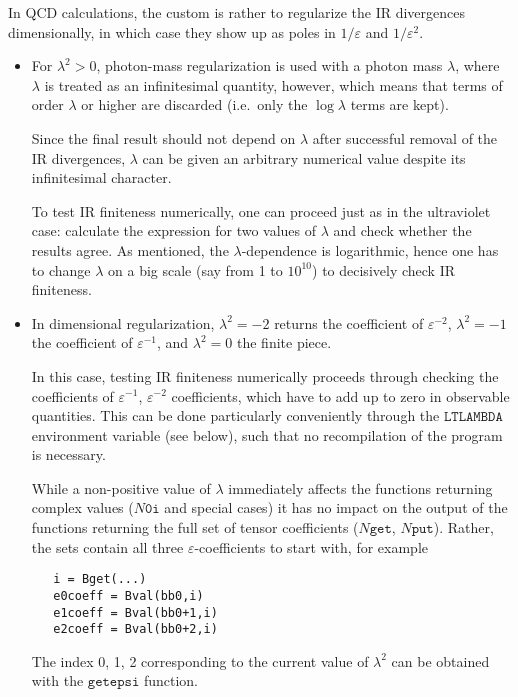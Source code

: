 \documentclass[twoside,12pt]{report}
\def\ie{i.e.\ }
\def\Code#1{\ensuremath{\texttt{#1}}}
\begin{document}
In QCD calculations, the custom is rather to regularize the IR 
divergences dimensionally, in which case they show up as poles in
$1/\varepsilon$ and $1/\varepsilon^2$.
%

\begin{itemize}
\item
For $\lambda^2 > 0$, photon-mass regularization is used with a photon
mass $\lambda$, where $\lambda$ is treated as an infinitesimal quantity,
however, which means that terms of order $\lambda$ or higher are 
discarded (\ie only the $\log\lambda$ terms are kept).

Since the final result should not depend on $\lambda$ after successful 
removal of the IR divergences, $\lambda$ can be given an arbitrary 
numerical value despite its infinitesimal character.

To test IR finiteness numerically, one can proceed just as in the
ultraviolet case: calculate the expression for two values of $\lambda$
and check whether the results agree.  As mentioned, the
$\lambda$-dependence is logarithmic, hence one has to change $\lambda$
on a big scale (say from 1 to $10^{10}$) to decisively check IR
finiteness.

\item
In dimensional regularization, $\lambda^2 = -2$ returns the coefficient
of $\varepsilon^{-2}$, $\lambda^2 = -1$ the coefficient of
$\varepsilon^{-1}$, and $\lambda^2 = 0$ the finite piece.

In this case, testing IR finiteness numerically proceeds through
checking the coefficients of $\varepsilon^{-1}$, $\varepsilon^{-2}$
coefficients, which have to add up to zero in observable quantities.  
This can be done particularly conveniently through the \Code{LTLAMBDA}
environment variable (see below), such that no recompilation of the 
program is necessary.

While a non-positive value of $\lambda$ immediately affects the 
functions returning complex values (\Code{$N$0i} and special cases) it 
has no impact on the output of the functions returning the full set of 
tensor coefficients (\Code{$N$get}, \Code{$N$put}).  Rather, the sets 
contain all three $\varepsilon$-coefficients to start with, for example
\begin{verbatim}
   i = Bget(...)
   e0coeff = Bval(bb0,i)
   e1coeff = Bval(bb0+1,i)
   e2coeff = Bval(bb0+2,i)
\end{verbatim}
The index 0, 1, 2 corresponding to the current value of $\lambda^2$ can
be obtained with the \Code{getepsi} function.

\end{itemize}
\end{document}

